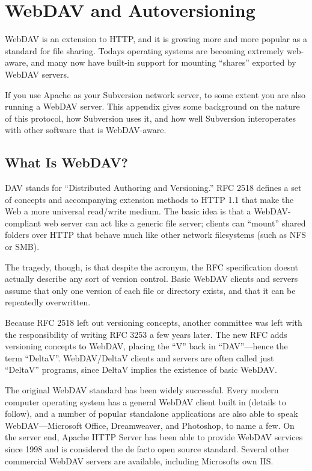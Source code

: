 \chapter{WebDAV and Autoversioning}\label{svn.webdav}

WebDAV is an extension to HTTP, and it is growing more and more popular
as a standard for file sharing. Today\textquotesingle s operating
systems are becoming extremely web-aware, and many now have built-in
support for mounting ``shares'' exported by WebDAV servers.

If you use Apache as your Subversion network server, to some extent you
are also running a WebDAV server. This appendix gives some background on
the nature of this protocol, how Subversion uses it, and how well
Subversion interoperates with other software that is WebDAV-aware.

\section{What Is WebDAV?}\label{svn.webdav.basic}

DAV stands for ``Distributed Authoring and Versioning.'' RFC 2518
defines a set of concepts and accompanying extension methods to HTTP 1.1
that make the Web a more universal read/write medium. The basic idea is
that a WebDAV-compliant web server can act like a generic file server;
clients can ``mount'' shared folders over HTTP that behave much like
other network filesystems (such as NFS or SMB).

The tragedy, though, is that despite the acronym, the RFC specification
doesn\textquotesingle t actually describe any sort of version control.
Basic WebDAV clients and servers assume that only one version of each
file or directory exists, and that it can be repeatedly overwritten.

Because RFC 2518 left out versioning concepts, another committee was
left with the responsibility of writing RFC 3253 a few years later. The
new RFC adds versioning concepts to WebDAV, placing the ``V'' back in
``DAV''---hence the term ``DeltaV''. WebDAV/DeltaV clients and servers
are often called just ``DeltaV'' programs, since DeltaV implies the
existence of basic WebDAV.

The original WebDAV standard has been widely successful. Every modern
computer operating system has a general WebDAV client built in (details
to follow), and a number of popular standalone applications are also
able to speak WebDAV---Microsoft Office, Dreamweaver, and Photoshop, to
name a few. On the server end, Apache HTTP Server has been able to
provide WebDAV services since 1998 and is considered the de facto open
source standard. Several other commercial WebDAV servers are available,
including Microsoft\textquotesingle s own IIS.

